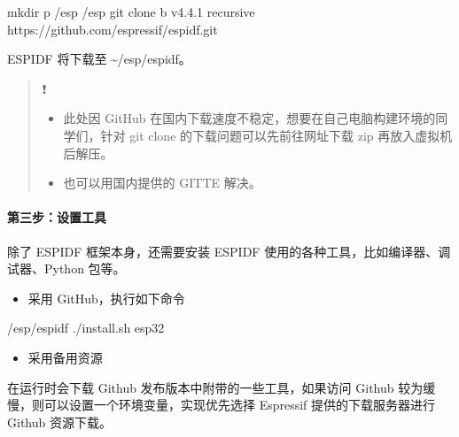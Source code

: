 \documentclass[a4paper,12pt,english]{sphinxmanual}
\begin{document}
\begin{sphinxVerbatim}[commandchars=\\\{\}]
mkdir \PYGZhy{}p \PYGZti{}/esp
 \PYGZti{}/esp
git clone \PYGZhy{}b v4.4.1 \PYGZhy{}\PYGZhy{}recursive https://github.com/espressif/esp\PYGZhy{}idf.git
\end{sphinxVerbatim}

\sphinxAtStartPar
ESP\sphinxhyphen{}IDF 将下载至 \textasciitilde{}/esp/esp\sphinxhyphen{}idf。
\begin{quote}

\sphinxAtStartPar
❗
\begin{itemize}
\item {} 
\sphinxAtStartPar
此处因 GitHub 在国内下载速度不稳定，想要在自己电脑构建环境的同学们，针对 git clone 的下载问题可以先前往网址下载 zip 再放入虚拟机后解压。

\item {} 
\sphinxAtStartPar
也可以用国内提供的 GITTE 解决。

\end{itemize}
\end{quote}


\paragraph{第三步：设置工具}
\label{\detokenize{exp-esp32/ide/esp-idf-setup:id13}}
\sphinxAtStartPar
除了 ESP\sphinxhyphen{}IDF 框架本身，还需要安装 ESP\sphinxhyphen{}IDF 使用的各种工具，比如编译器、调试器、Python 包等。
\begin{itemize}
\item {} 
\sphinxAtStartPar
采用 GitHub，执行如下命令

\end{itemize}

\begin{sphinxVerbatim}[commandchars=\\\{\}]
 \PYGZti{}/esp/esp\PYGZhy{}idf
./install.sh esp32
\end{sphinxVerbatim}
\begin{itemize}
\item {} 
\sphinxAtStartPar
采用备用资源

\end{itemize}

\sphinxAtStartPar
在运行时会下载 Github 发布版本中附带的一些工具，如果访问 Github 较为缓慢，则可以设置一个环境变量，实现优先选择 Espressif 提供的下载服务器进行 Github 资源下载。
\end{document}
